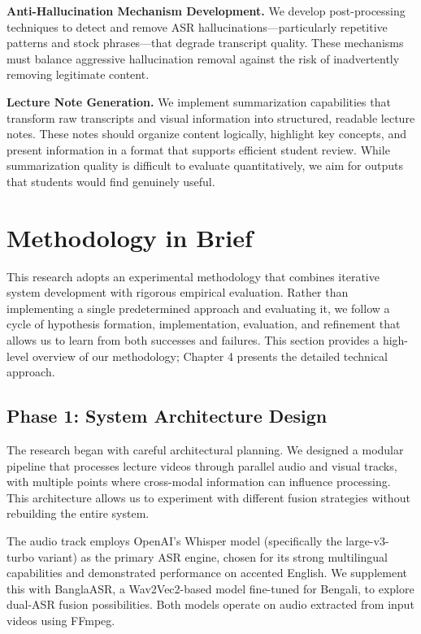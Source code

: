 \textbf{Anti-Hallucination Mechanism Development.} We develop post-processing techniques to detect and remove ASR hallucinations---particularly repetitive patterns and stock phrases---that degrade transcript quality. These mechanisms must balance aggressive hallucination removal against the risk of inadvertently removing legitimate content.

\textbf{Lecture Note Generation.} We implement summarization capabilities that transform raw transcripts and visual information into structured, readable lecture notes. These notes should organize content logically, highlight key concepts, and present information in a format that supports efficient student review. While summarization quality is difficult to evaluate quantitatively, we aim for outputs that students would find genuinely useful.

\section{Methodology in Brief}

This research adopts an experimental methodology that combines iterative system development with rigorous empirical evaluation. Rather than implementing a single predetermined approach and evaluating it, we follow a cycle of hypothesis formation, implementation, evaluation, and refinement that allows us to learn from both successes and failures. This section provides a high-level overview of our methodology; Chapter 4 presents the detailed technical approach.

\subsection{Phase 1: System Architecture Design}

The research began with careful architectural planning. We designed a modular pipeline that processes lecture videos through parallel audio and visual tracks, with multiple points where cross-modal information can influence processing. This architecture allows us to experiment with different fusion strategies without rebuilding the entire system.

The audio track employs OpenAI's Whisper model (specifically the large-v3-turbo variant) as the primary ASR engine, chosen for its strong multilingual capabilities and demonstrated performance on accented English. We supplement this with BanglaASR, a Wav2Vec2-based model fine-tuned for Bengali, to explore dual-ASR fusion possibilities. Both models operate on audio extracted from input videos using FFmpeg.


